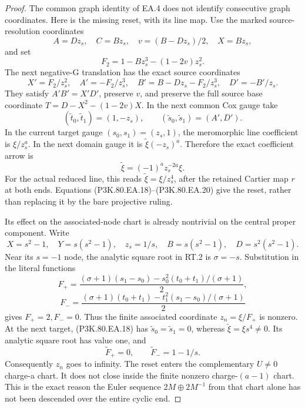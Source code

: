 \begin{proof}
The common graph identity of EA.4 does not identify consecutive graph
coordinates. Here is the missing reset, with its line map. Use the
marked source-resolution coordinates
\[
 A=Dz_s,\quad C=Bz_s,\quad
 v=(B-Dz_s)/2,\quad X=Bz_s,
\]
and set
\[
 F_2=1-Bz_s^3-(1-2v)z_s^2.
\]
The next negative-G translation has the exact source coordinates
\[
 X'=F_2/z_s^2,\quad A'=-F_2/z_s^3,\quad
 B'=B-Dz_s-F_2/z_s^3,\quad D'=-B'/z_s.
 \tag{P3K.80.EA.18}
\]
They satisfy \(A'B'=X'D'\), preserve \(v\), and preserve the full
source base coordinate
\(T=D-X^2-(1-2v)X\). In the next common Cox gauge take
\[
 (\widetilde t_0,\widetilde t_1)=(1,-z_s),\qquad
 (\widetilde s_0,\widetilde s_1)=(A',D').
 \tag{P3K.80.EA.19}
\]
In the current target gauge \((s_0,s_1)=(z_s,1)\), the meromorphic
line coefficient is \(\xi/z_s^a\). In the next domain gauge it is
\(\widetilde\xi(-z_s)^a\). Therefore the exact coefficient arrow is
\[
            \widetilde\xi=(-1)^a z_s^{-2a}\xi.
 \tag{P3K.80.EA.20}
\]
For the actual reduced line, this reads
\(\widetilde\xi=\xi/z_s^4\), after the retained Cartier map
\(r\) at both ends. Equations (P3K.80.EA.18)--(P3K.80.EA.20) give the reset,
rather than replacing it by the bare projective ruling.

Its effect on the associated-node chart is already nontrivial on the
central proper component. Write
\[
 X=s^2-1,\quad Y=s(s^2-1),\quad z_s=1/s,\quad
 B=s(s^2-1),\quad D=s^2(s^2-1).
\]
Near its \(s=-1\) node, the analytic square root in RT.2 is
\(\sigma=-s\). Substitution in the literal functions
\[
 F_+=\frac{(\sigma+1)(s_1-s_0)
                -s_0^2(t_0+t_1)/(\sigma+1)}2,
\]
\[
 F_-=\frac{(\sigma+1)(t_0+t_1)
                -t_1^2(s_1-s_0)/(\sigma+1)}2
\]
gives \(F_+=2,F_-=0\). Thus the finite associated coordinate
\(z_n=\xi/F_+\) is nonzero. At the next target, (P3K.80.EA.18) has
\(\widetilde s_0=\widetilde s_1=0\), whereas
\(\widetilde\xi=\xi s^4\ne0\). Its analytic square root has
value one, and
\[
             \widetilde F_+=0,\qquad
             \widetilde F_-=1-1/s.
\]
Consequently \(z_n\) goes to infinity. The reset enters the
complementary \(U\ne0\) charge-a chart. It does not close inside
the finite nonzero charge-\((a-1)\) chart. This is the exact reason
the Euler sequence \(2M\oplus2M^{-1}\) from that chart alone has
not been descended over the entire cyclic end.


\end{proof}
